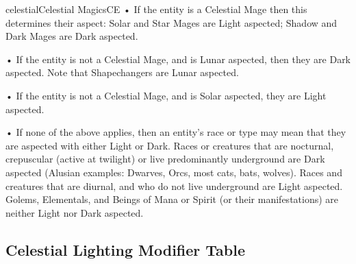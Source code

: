 \begin{College}[1.3]{celestial}{Celestial Magics}{CE}
• If the entity is a Celestial Mage then this determines their
aspect: Solar and Star Mages are Light aspected; Shadow and Dark Mages
are Dark aspected.

• If the entity is not a Celestial Mage, and is Lunar aspected, then
they are Dark aspected.  Note that Shapechangers are Lunar aspected.

• If the entity is not a Celestial Mage, and is Solar aspected, they
are Light aspected.

• If none of the above applies, then an entity’s race or type may mean
that they are aspected with either Light or Dark.  Races or creatures
that are nocturnal, crepuscular (active at twilight) or live
predominantly underground are Dark aspected (Alusian examples:
Dwarves, Orcs, most cats, bats, wolves).  Races and creatures that are
diurnal, and who do not live underground are Light aspected.  Golems,
Elementals, and Beings of Mana or Spirit (or their manifestations) are
neither Light nor Dark aspected.

\begin{table*}
\section{Celestial Lighting Modifier Table}


\end{table*}
\end{College}
